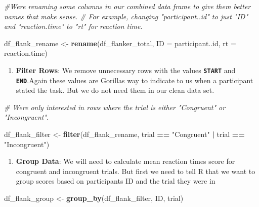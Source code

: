 \documentclass[
]{book}
\newenvironment{Shaded}{\begin{snugshade}}{\end{snugshade}}
\newcommand{\AttributeTok}[1]{\textcolor[rgb]{0.13,0.29,0.53}{#1}}
\newcommand{\CommentTok}[1]{\textcolor[rgb]{0.56,0.35,0.01}{\textit{#1}}}
\newcommand{\FunctionTok}[1]{\textcolor[rgb]{0.13,0.29,0.53}{\textbf{#1}}}
\newcommand{\NormalTok}[1]{#1}
\newcommand{\OtherTok}[1]{\textcolor[rgb]{0.56,0.35,0.01}{#1}}
\newcommand{\SpecialCharTok}[1]{\textcolor[rgb]{0.81,0.36,0.00}{\textbf{#1}}}
\newcommand{\StringTok}[1]{\textcolor[rgb]{0.31,0.60,0.02}{#1}}
\providecommand{\tightlist}{%
  \setlength{\itemsep}{0pt}\setlength{\parskip}{0pt}}
\begin{document}
\begin{Shaded}
\begin{Highlighting}[]
\CommentTok{\#We\textquotesingle{}re renaming some columns in our combined data frame to give them better names that make sense.}
\CommentTok{\# For example, changing "participant..id" to just "ID" and "reaction.time" to "rt" for reaction time.}

\NormalTok{df\_flank\_rename }\OtherTok{\textless{}{-}} \FunctionTok{rename}\NormalTok{(df\_flanker\_total,}
                          \AttributeTok{ID =}\NormalTok{ participant..id,}
                          \AttributeTok{rt =}\NormalTok{ reaction.time)}
\end{Highlighting}
\end{Shaded}

\begin{enumerate}
\def\labelenumi{\arabic{enumi}.}
\setcounter{enumi}{1}
\tightlist
\item
  \textbf{Filter Rows}: We remove unnecessary rows with the values \textbf{\texttt{START}} and \textbf{\texttt{END}}.Again these values are Gorillas way to indicate to us when a participant stated the task. But we do not need them in our clean data set.
\end{enumerate}

\begin{Shaded}
\begin{Highlighting}[]
\CommentTok{\# We\textquotesingle{}re only interested in rows where the trial is either "Congruent" or "Incongruent".}

\NormalTok{df\_flank\_filter }\OtherTok{\textless{}{-}} \FunctionTok{filter}\NormalTok{(df\_flank\_rename,}
\NormalTok{                          trial }\SpecialCharTok{==} \StringTok{"Congruent"} \SpecialCharTok{|}\NormalTok{ trial }\SpecialCharTok{==} \StringTok{"Incongruent"}\NormalTok{)}
\end{Highlighting}
\end{Shaded}

\begin{enumerate}
\def\labelenumi{\arabic{enumi}.}
\setcounter{enumi}{2}
\tightlist
\item
  \textbf{Group Data}: We will need to calculate mean reaction times score for congruent and incongruent trials. But first we need to tell R that we want to group scores based on participants ID and the trial they were in
\end{enumerate}

\begin{Shaded}
\begin{Highlighting}[]
\NormalTok{df\_flank\_group }\OtherTok{\textless{}{-}} \FunctionTok{group\_by}\NormalTok{(df\_flank\_filter, ID, trial)}
\end{Highlighting}
\end{Shaded}
\end{document}
